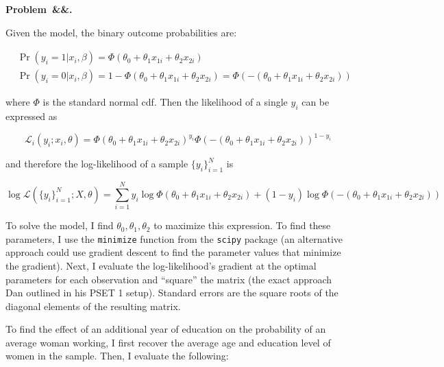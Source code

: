 \documentclass[12pt]{article}
\newcounter{problem}
\newenvironment{problem}[1][]{
    \newpage %
    \refstepcounter{problem}\par\noindent
    \textbf{Problem~\theproblem\ifx&#1&\else.~#1\fi}\rmfamily\par\vspace{0.5em}
}{\vspace{1em}}
\begin{document}
\fancyhf{} %
\vspace{1em}

\begin{problem}

\begin{subproblems}
    \item Given the model, the binary outcome probabilities are: 
    
    \begin{align*}
        &\Pr(y_i = 1 | x_i, \beta) = \Phi(\theta_0 + \theta_1 x_{1i} + \theta_2 x_{2i}) \\
        &\Pr(y_i = 0 | x_i, \beta) = 1 - \Phi(\theta_0 + \theta_1 x_{1i} + \theta_2 x_{2i}) = \Phi(-(\theta_0 + \theta_1 x_{1i} + \theta_2 x_{2i}))
    \end{align*}

    where $\Phi$ is the standard normal cdf. Then the likelihood of a single $y_i$ can be expressed as 

    \[
    \mathscr{L}_i(y_i; x_i, \theta) = \Phi(\theta_0 + \theta_1 x_{1i} + \theta_2 x_{2i})^{y_i}\Phi(-(\theta_0 + \theta_1 x_{1i} + \theta_2 x_{2i}))^{1-y_i}
    \]

    and therefore the log-likelihood of a sample $\{y_i\}_{i=1}^N$ is 

    \[
    \log \mathscr{L}(\{y_i\}_{i=1}^N; X, \theta) = \sum_{i=1}^N y_i\log\Phi(\theta_0 + \theta_1 x_{1i} + \theta_2 x_{2i})
    + (1-y_i)\log\Phi(-(\theta_0 + \theta_1 x_{1i} + \theta_2 x_{2i}))
    \]

    To solve the model, I find $\theta_0, \theta_1, \theta_2$ to maximize this expression. To find these parameters, I use the \texttt{minimize} function from the \texttt{scipy} package (an alternative approach could use gradient descent to find the parameter values that minimize the gradient). Next, I evaluate the log-likelihood's gradient at the optimal parameters for each observation and ``square'' the matrix (the exact approach Dan outlined in his PSET 1 setup). Standard errors are the square roots of the diagonal elements of the resulting matrix. 

    \begin{table}[H]
        \centering 
        \caption{Probit Estimates}
        \label{tab:probit}
        
    \end{table}

    \item To find the effect of an additional year of education on the probability of an average woman working, I first recover the average age and education level of women in the sample. Then, I evaluate the following: 
    

\end{subproblems}
\end{problem}
\end{document}
